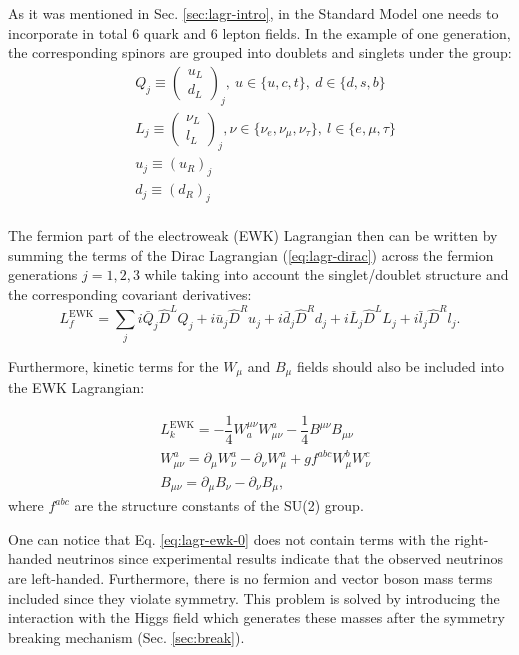 As it was mentioned in Sec. \ref{sec:lagr-intro}, in the Standard Model one needs to incorporate in total 6 quark and 6 lepton fields. In the example of one generation, the corresponding spinors are grouped into doublets and singlets under the \sutwo group:
\begin{align}\label{eq:ferm-notation}
    &Q_j \equiv \left(\begin{matrix} u_L \\ d_L \end{matrix}\right)_j, ~u \in \{u, c, t\}, ~d \in \{d, s, b\}\\
    &L_j \equiv \left(\begin{matrix} \nu_L \\ l_L \end{matrix}\right)_j, \nu \in \{\nu_{e}, \nu_{\mu}, \nu_{\tau}\}, ~l \in \{e, \mu, \tau\}\\
    &u_j \equiv (u_R)_j\\
    &d_j \equiv (d_R)_j\\
\end{align}

The fermion part of the electroweak (EWK) Lagrangian then can be written by summing the terms of the Dirac Lagrangian (\ref{eq:lagr-dirac}) across the fermion generations $j = 1,2,3$ while taking into account the \sutwo singlet/doublet structure and the corresponding covariant derivatives:
\begin{equation}\label{eq:lagr-ewk-0}
    L_f^\text{EWK} = \sum_j i\bar{Q}_j\hat{D}^L Q_j + i\bar{u}_j\hat{D}^R u_j + i\bar{d}_j\hat{D}^R d_j + i\bar{L}_j\hat{D}^L L_j + i\bar{l}_j\hat{D}^R l_j.
\end{equation}

Furthermore, kinetic terms for the $W_\mu$ and $B_\mu$ fields should also be included into the EWK Lagrangian:

\begin{align}
    &L_k^\text{EWK} = -\dfrac{1}{4}W_a^{\mu\nu}W^a_{\mu\nu}-\dfrac{1}{4}B^{\mu\nu}B_{\mu\nu}\\
    &W^a_{\mu\nu} = \partial_\mu W^a_\nu - \partial_\nu W^a_\mu +gf^{abc}W^b_\mu W^c_\nu\\
    &B_{\mu\nu} = \partial_\mu B_\nu - \partial_\nu B_\mu,
\end{align}
where $f^{abc}$ are the structure constants of the SU(2) group.

One can notice that Eq. \ref{eq:lagr-ewk-0} does not contain terms with the right-handed neutrinos since experimental results indicate that the observed neutrinos are left-handed. Furthermore, there is no fermion and vector boson mass terms included since they violate \sutwo symmetry. This problem is solved by introducing the interaction with the Higgs field which generates these masses after the symmetry breaking mechanism (Sec. \ref{sec:break}). 

